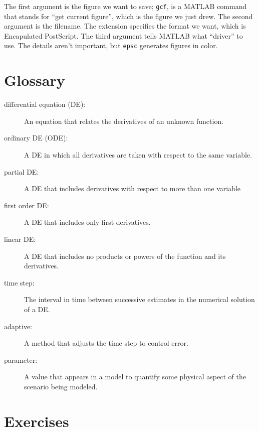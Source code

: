 \documentclass[
]{book}
\numberwithin{Answer}{chapter}
\numberwithin{Exercise}{chapter}
\begin{document}
The first argument is the figure we want to save; {\tt gcf}, is a MATLAB command that stands for ``get current figure'', which is the figure we just drew.  The second argument is the filename.  The extension specifies the format we want, which is Encapulated PostScript.  The third argument tells MATLAB what ``driver'' to use.  The details aren't important, but {\tt epsc} generates figures in color.




\section{Glossary}

\begin{description}

\item[differential equation (DE):] An equation that relates the
derivatives of an unknown function.

\item[ordinary DE (ODE):] A DE in which all derivatives are taken with
respect to the same variable.

\item[partial DE:] A DE that includes derivatives with respect to
more than one variable

\item[first order DE:] A DE that includes only first derivatives.

\item[linear DE:] A DE that includes no products or powers of the
function and its derivatives.

\item[time step:] The interval in time between successive estimates
in the numerical solution of a DE.

\item[adaptive:] A method that adjusts the time step to control error.

\item[parameter:] A value that appears in a model to quantify some
physical aspect of the scenario being modeled.

\end{description}

\section{Exercises}
\end{document}
